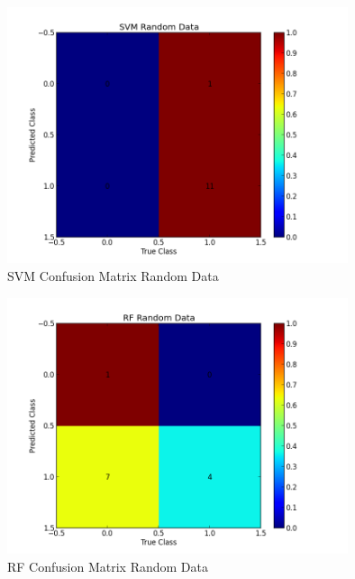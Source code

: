 \begin{figure}[!h]
 \centering
\includegraphics[width=10cm]{SVMCMRandomData}
  \caption[SVM Confusion Matrix Random Data]
   {SVM Confusion Matrix Random Data}
\end{figure}\leavevmode 

\begin{figure}[!h]
 \centering
\includegraphics[width=10cm]{RFCMRandomData}
  \caption[RF Confusion Matrix Random Data]
   {RF Confusion Matrix Random Data}
\end{figure}\leavevmode 